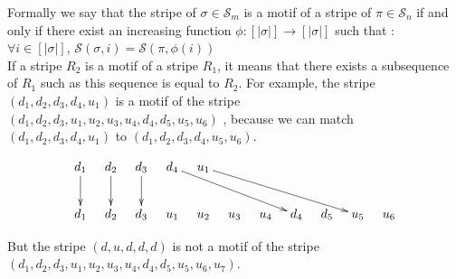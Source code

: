 \documentclass[a4paper]{llncs}
\newcommand{\Perm}[1]{\mathcal{S}_{#1}}
\newcommand{\ptext}{\pi}
\newcommand{\pmotif}{\sigma}
\newcounter{num}
\newcommand{\numl}[1]{\refstepcounter{num}\label{#1}}
\newcommand{\dstep}{d}
\newcommand{\ustep}{u}
\begin{document}
		

		
		Formally we say that the stripe of $\pmotif \in \Perm{m}$ is a motif
		of a stripe of $\ptext \in \Perm{n}$ if and only if there exist an increasing function $\phi : [|\pmotif|] \rightarrow [|\pmotif|]$
		such that : \\
		$\forall i \in [|\pmotif|]$, $\mathcal{S}(\pmotif,i) = \mathcal{S}(\ptext,\phi(i))$\\
		If a stripe $R_2$ is a motif of a stripe $R_1$,
		it means that there exists
		a subsequence of $R_1$ such as
		this sequence is equal to $R_2$.
		For example, the stripe $(\dstep_1,\dstep_2,\dstep_3,\dstep_4,\ustep_1)$ is a motif of  the stripe \\
		$(\dstep_1,\dstep_2,\dstep_3,\ustep_1,\ustep_2,\ustep_3,\ustep_4,\dstep_4,\dstep_5,\ustep_5,\ustep_6)$ ,
		because we can match \\
		$(\dstep_1,\dstep_2,\dstep_3,\dstep_4,\ustep_1)$ to $(\dstep_1,\dstep_2,\dstep_3,\dstep_4,\ustep_5,\ustep_6)$.
		\begin{figure}[h!]
			\begin{displaymath}
				\xymatrix@=0.3cm{
					\dstep_1 \ar[dd] & \dstep_2 \ar[dd] & \dstep_3 \ar[dd] & \dstep_4\ar[ddrrrr]  & \ustep_1 \ar[ddrrrrr]\\
					\\
					\dstep_1 & \dstep_2 & \dstep_3 & \ustep_1 & \ustep_2 & \ustep_3 & \ustep_4 & \dstep_4 & \dstep_5 & \ustep_5 & \ustep_6 \\
				}
			\end{displaymath}     
		\end{figure}		
		But the stripe $(\dstep,\ustep,\dstep,\dstep,\dstep)$ is not a motif of the stripe\\ $(\dstep_1,\dstep_2,\dstep_3,\ustep_1,\ustep_2,\ustep_3,\ustep_4,\dstep_4,\dstep_5,\ustep_5,\ustep_6,\ustep_7)$.\\
		
\end{document}
